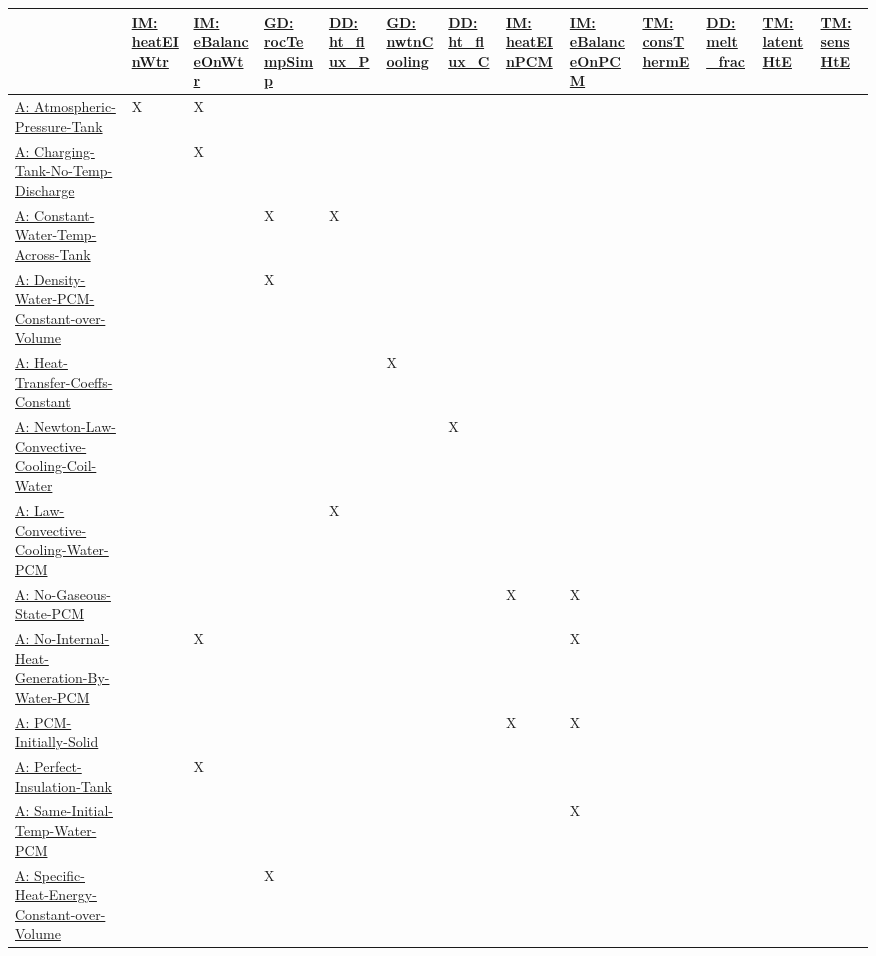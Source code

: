 \documentclass[12pt]{article}
\begin{document}
\begin{longtable}{l l l l l l l l l l l l l}
\toprule
 & \hyperref[IM:heatEInWtr]{IM: heatEInWtr} & \hyperref[IM:eBalanceOnWtr]{IM: eBalanceOnWtr} & \hyperref[GD:rocTempSimp]{GD: rocTempSimp} & \hyperref[DD:ht.flux.P]{DD: ht\_flux\_P} & \hyperref[GD:nwtnCooling]{GD: nwtnCooling} & \hyperref[DD:ht.flux.C]{DD: ht\_flux\_C} & \hyperref[IM:heatEInPCM]{IM: heatEInPCM} & \hyperref[IM:eBalanceOnPCM]{IM: eBalanceOnPCM} & \hyperref[T:consThermE]{TM: consThermE} & \hyperref[DD:melt.frac]{DD: melt\_frac} & \hyperref[T:latentHtE]{TM: latentHtE} & \hyperref[T:sensHtE]{TM: sensHtE}
\\
\midrule
\hyperref[A:Atmospheric-Pressure-Tank]{A: Atmospheric-Pressure-Tank} & X & X &  &  &  &  &  &  &  &  &  & 
\\
\hyperref[A:Charging-Tank-No-Temp-Discharge]{A: Charging-Tank-No-Temp-Discharge} &  & X &  &  &  &  &  &  &  &  &  & 
\\
\hyperref[A:Constant-Water-Temp-Across-Tank]{A: Constant-Water-Temp-Across-Tank} &  &  & X & X &  &  &  &  &  &  &  & 
\\
\hyperref[A:Density-Water-PCM-Constant-over-Volume]{A: Density-Water-PCM-Constant-over-Volume} &  &  & X &  &  &  &  &  &  &  &  & 
\\
\hyperref[A:Heat-Transfer-Coeffs-Constant]{A: Heat-Transfer-Coeffs-Constant} &  &  &  &  & X &  &  &  &  &  &  & 
\\
\hyperref[A:Newton-Law-Convective-Cooling-Coil-Water]{A: Newton-Law-Convective-Cooling-Coil-Water} &  &  &  &  &  & X &  &  &  &  &  & 
\\
\hyperref[A:Law-Convective-Cooling-Water-PCM]{A: Law-Convective-Cooling-Water-PCM} &  &  &  & X &  &  &  &  &  &  &  & 
\\
\hyperref[A:No-Gaseous-State-PCM]{A: No-Gaseous-State-PCM} &  &  &  &  &  &  & X & X &  &  &  & 
\\
\hyperref[A:No-Internal-Heat-Generation-By-Water-PCM]{A: No-Internal-Heat-Generation-By-Water-PCM} &  & X &  &  &  &  &  & X &  &  &  & 
\\
\hyperref[A:PCM-Initially-Solid]{A: PCM-Initially-Solid} &  &  &  &  &  &  & X & X &  &  &  & 
\\
\hyperref[A:Perfect-Insulation-Tank]{A: Perfect-Insulation-Tank} &  & X &  &  &  &  &  &  &  &  &  & 
\\
\hyperref[A:Same-Initial-Temp-Water-PCM]{A: Same-Initial-Temp-Water-PCM} &  &  &  &  &  &  &  & X &  &  &  & 
\\
\hyperref[A:Specific-Heat-Energy-Constant-over-Volume]{A: Specific-Heat-Energy-Constant-over-Volume} &  &  & X &  &  &  &  &  &  &  &  & 

\end{longtable}
\end{document}
